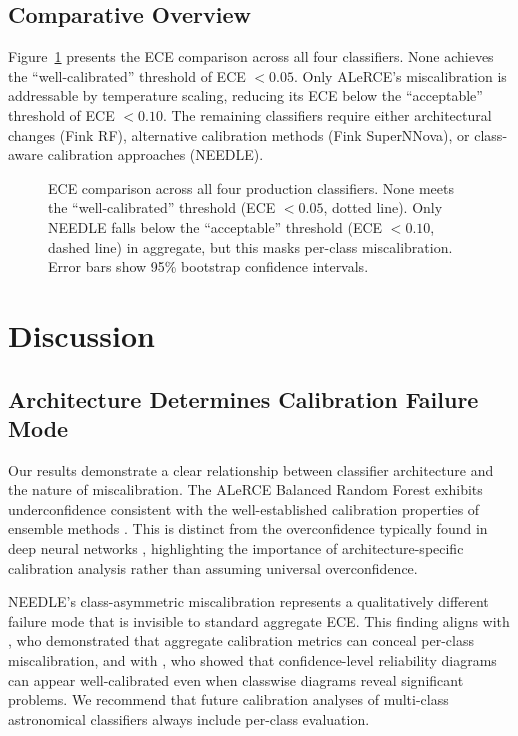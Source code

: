 \documentclass[twocolumn]{aastex631}
\begin{document}
\subsection{Comparative Overview}

Figure~\ref{fig:summary} presents the ECE comparison across all four classifiers. None achieves the ``well-calibrated'' threshold of ECE $< 0.05$. Only ALeRCE's miscalibration is addressable by temperature scaling, reducing its ECE below the ``acceptable'' threshold of ECE $< 0.10$. The remaining classifiers require either architectural changes (Fink RF), alternative calibration methods (Fink SuperNNova), or class-aware calibration approaches (NEEDLE).

\begin{figure}
\caption{ECE comparison across all four production classifiers. None meets the ``well-calibrated'' threshold (ECE $< 0.05$, dotted line). Only NEEDLE falls below the ``acceptable'' threshold (ECE $< 0.10$, dashed line) in aggregate, but this masks per-class miscalibration. Error bars show 95\% bootstrap confidence intervals. \label{fig:summary}}
\end{figure}


\section{Discussion} \label{sec:discussion}

\subsection{Architecture Determines Calibration Failure Mode}

Our results demonstrate a clear relationship between classifier architecture and the nature of miscalibration. The ALeRCE Balanced Random Forest exhibits underconfidence consistent with the well-established calibration properties of ensemble methods \citep{niculescumizil2005, bostrom2008, loecher2024}. This is distinct from the overconfidence typically found in deep neural networks \citep{guo2017}, highlighting the importance of architecture-specific calibration analysis rather than assuming universal overconfidence.

NEEDLE's class-asymmetric miscalibration represents a qualitatively different failure mode that is invisible to standard aggregate ECE. This finding aligns with \citet{nixon2019}, who demonstrated that aggregate calibration metrics can conceal per-class miscalibration, and with \citet{kull2019}, who showed that confidence-level reliability diagrams can appear well-calibrated even when classwise diagrams reveal significant problems. We recommend that future calibration analyses of multi-class astronomical classifiers always include per-class evaluation.
\end{document}
